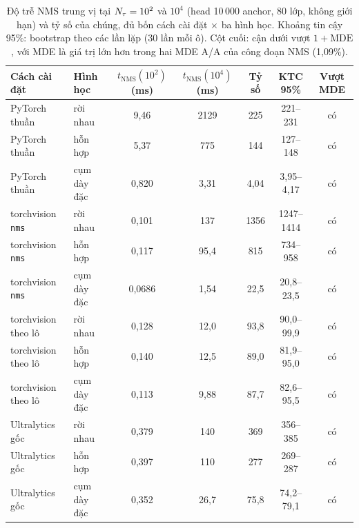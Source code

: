 \begin{table}[t]
\centering\small
\caption{Độ trễ NMS trung vị tại $N_{\tau}=10^2$ và $10^4$ (head 10\,000 anchor, 80 lớp, không giới hạn) và tỷ số của chúng, đủ bốn cách cài đặt $\times$ ba hình học. Khoảng tin cậy 95\%: bootstrap theo các lần lặp (30 lần mỗi ô). Cột cuối: cận dưới vượt $1+\mathrm{MDE}$, với MDE là giá trị lớn hơn trong hai MDE A/A của công đoạn NMS (1,09\%).}
\label{tab:dose}
\begin{tabular}{@{}llccccc@{}}
\toprule
Cách cài đặt & Hình học & $t_{\mathrm{NMS}}(10^2)$ (ms) & $t_{\mathrm{NMS}}(10^4)$ (ms) & Tỷ số & KTC 95\% & Vượt MDE \\
\midrule
PyTorch thuần & rời nhau & 9,46 & 2129 & 225 & 221--231 & có \\
PyTorch thuần & hỗn hợp & 5,37 & 775 & 144 & 127--148 & có \\
PyTorch thuần & cụm dày đặc & 0,820 & 3,31 & 4,04 & 3,95--4,17 & có \\
torchvision \texttt{nms} & rời nhau & 0,101 & 137 & 1356 & 1247--1414 & có \\
torchvision \texttt{nms} & hỗn hợp & 0,117 & 95,4 & 815 & 734--958 & có \\
torchvision \texttt{nms} & cụm dày đặc & 0,0686 & 1,54 & 22,5 & 20,8--23,5 & có \\
torchvision theo lô & rời nhau & 0,128 & 12,0 & 93,8 & 90,0--99,9 & có \\
torchvision theo lô & hỗn hợp & 0,140 & 12,5 & 89,0 & 81,9--95,0 & có \\
torchvision theo lô & cụm dày đặc & 0,113 & 9,88 & 87,7 & 82,6--95,5 & có \\
Ultralytics gốc & rời nhau & 0,379 & 140 & 369 & 356--385 & có \\
Ultralytics gốc & hỗn hợp & 0,397 & 110 & 277 & 269--287 & có \\
Ultralytics gốc & cụm dày đặc & 0,352 & 26,7 & 75,8 & 74,2--79,1 & có \\
\bottomrule
\end{tabular}
\end{table}
